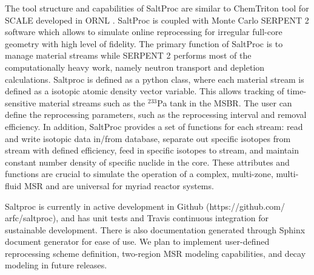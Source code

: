 The tool structure and capabilities of SaltProc are similar to ChemTriton tool 
for SCALE
developed in \gls{ORNL} \cite{powers_new_2013}. SaltProc is coupled with Monte 
Carlo SERPENT 2
software which allows to simulate online reprocessing for irregular full-core 
geometry with 
high level of fidelity.  The primary function of SaltProc is to manage material 
streams while
SERPENT 2 performs most of the computationally heavy work, namely neutron 
transport and depletion
calculations. Saltproc is defined as a 
python class, where each material stream is defined as a isotopic atomic density
vector variable. This allows tracking of time-sensitive material streams such as 
the
$^{233}$Pa tank in the \gls{MSBR}. The user can define the reprocessing 
parameters, such as the 
reprocessing interval and removal efficiency.  In addition, SaltProc provides a 
set of functions 
for each stream: read and write isotopic data in/from database, separate out 
specific isotopes 
from stream with defined efficiency, feed in specific isotopes to stream, and 
maintain constant 
number density of specific nuclide in the core. These attributes and functions 
are crucial to 
simulate the operation of a complex, multi-zone, multi-fluid \gls{MSR} and are 
universal for 
myriad reactor systems.

Saltproc is currently in active development in Github (https://github.com/ 
arfc/saltproc), and has unit tests and Travis continuous integration for 
sustainable development. There is also documentation
generated through Sphinx document generator for ease of use. We plan to 
implement
user-defined reprocessing scheme definition, two-region \gls{MSR} modeling 
capabilities,
and decay modeling in future releases.

